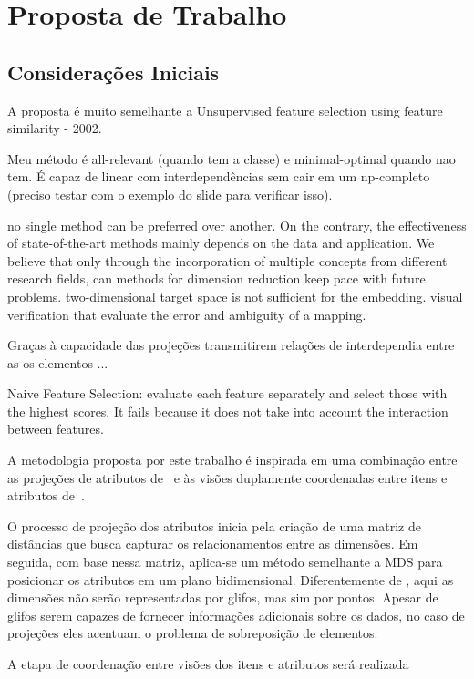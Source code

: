 \chapter{Proposta de Trabalho}\label{chap:proposta}

\section{Considerações Iniciais}

A proposta é muito semelhante a Unsupervised feature selection using feature similarity - 2002.


Meu método é all-relevant (quando tem a classe) e minimal-optimal quando nao tem. É capaz de linear com interdependências sem cair em um np-completo (preciso testar com o exemplo do slide para verificar isso).

\cite{Engel2012} no single method can be preferred over another. On the contrary, the effectiveness of state-of-the-art methods mainly depends on the data and application. 
We believe that only through the incorporation of multiple concepts from different research fields, can methods for dimension reduction keep pace with future problems. two-dimensional target space is not sufficient for the embedding. visual verification that evaluate the error and ambiguity of a mapping.

Graças à capacidade das projeções transmitirem relações de interdependia entre as os elementos ... 

Naive Feature Selection: evaluate each feature separately and select those with the highest scores. It fails because it does not take into account the interaction between features.

A metodologia proposta por este trabalho é inspirada em uma combinação entre as projeções de atributos de~\cite{Yang2004} e às visões duplamente coordenadas entre itens e atributos de~\cite{Turkay2011}. 

O processo de projeção dos atributos inicia pela criação de uma matriz de distâncias que busca capturar os relacionamentos entre as dimensões. Em seguida, com base nessa matriz, aplica-se um método semelhante a MDS para posicionar os atributos em um plano bidimensional. Diferentemente de \cite{Yang2004}, aqui as dimensões não serão representadas por glifos, mas sim por pontos. Apesar de glifos serem capazes de fornecer informações adicionais sobre os dados, no caso de projeções eles acentuam o problema de sobreposição de elementos.

A etapa de coordenação entre visões dos itens e atributos será realizada 

